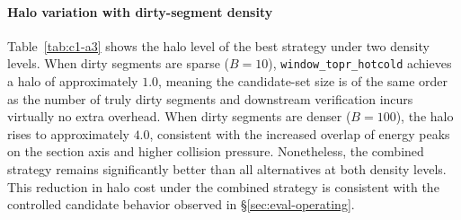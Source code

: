 \paragraph{Halo variation with dirty-segment density}

Table~\ref{tab:c1-a3} shows the halo level of the best strategy under two density levels. When dirty segments are sparse ($B=10$), \texttt{window\_topr\_hotcold} achieves a halo of approximately $1.0$, meaning the candidate-set size is of the same order as the number of truly dirty segments and downstream verification incurs virtually no extra overhead. When dirty segments are denser ($B=100$), the halo rises to approximately $4.0$, consistent with the increased overlap of energy peaks on the section axis and higher collision pressure. Nonetheless, the combined strategy remains significantly better than all alternatives at both density levels. This reduction in halo cost under the combined strategy is consistent with the controlled candidate behavior observed in \S\ref{sec:eval-operating}.
